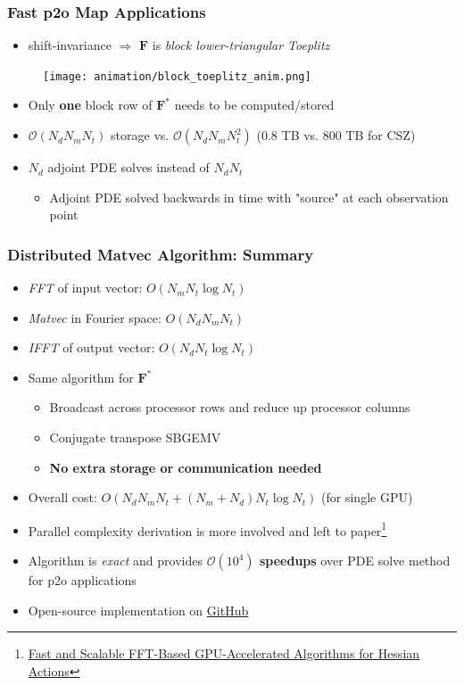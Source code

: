 \begin{frame}
    \frametitle{Fast p2o Map Applications}
    \begin{itemize}
        \item shift-invariance \(\Rightarrow\) \(\mathbf{F}\) is \emph{block lower-triangular Toeplitz}
    \end{itemize}
    \begin{figure}
        \texttt{[image: animation/block\_toeplitz\_anim.png]}
    \end{figure}
    \begin{itemize}
        \item Only \textbf{one} block row of \(\mathbf{F}^*\) needs to be computed/stored
        \item \(\mathcal{O}(N_dN_mN_t)\) storage vs. \(\mathcal{O}(N_dN_mN_t^2)\) (0.8 TB vs. 800 TB for CSZ)
        \item \(N_d\) adjoint PDE solves instead of \(N_dN_t\)
        \begin{itemize}
            \item Adjoint PDE solved backwards in time with "source" at each observation point
        \end{itemize}
    \end{itemize}
\end{frame}

\begin{frame}
    \frametitle{Distributed Matvec Algorithm: Summary}
    \begin{itemize}
        \item \emph{FFT} of input vector: \(O(N_mN_t\log N_t)\)
        \item \emph{Matvec} in Fourier space: \(O(N_dN_mN_t)\)
        \item \emph{IFFT} of output vector: \(O(N_dN_t\log N_t)\)
        \item Same algorithm for \(\mathbf{F}^*\)
        \begin{itemize}
            \item Broadcast across processor rows and reduce up processor columns
            \item Conjugate transpose SBGEMV
            \item \textbf{No extra storage or communication needed}
        \end{itemize}
        \item Overall cost: \(O(N_dN_mN_t + (N_m+N_d)N_t\log N_t)\) (for single GPU)
        \item Parallel complexity derivation is more involved and left to paper\footnote{\href{https://arxiv.org/pdf/2407.13066}{Fast and Scalable FFT-Based GPU-Accelerated Algorithms for Hessian Actions}}
        \item Algorithm is \emph{exact} and provides \textbf{\(\mathcal{O}(10^4)\) speedups} over PDE solve method for p2o applications
        \item Open-source implementation on \href{https://github.com/s769/FFTMatvec}{GitHub}
    \end{itemize}
\end{frame}

